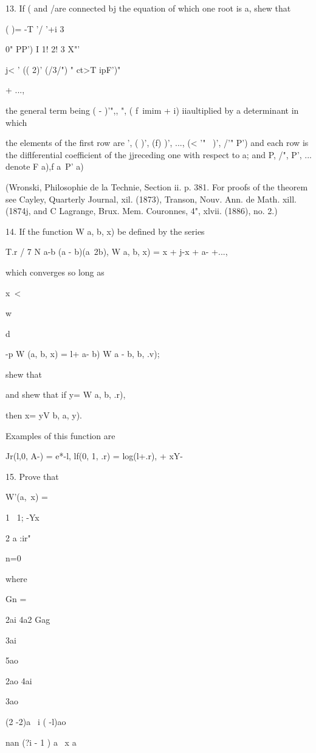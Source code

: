 {{13. If ( and /are connected bj the equation of which one root is a,
shew that

 ( )= -T '/ '+i 3

0" PP') I 1! 2! 3 X"'

j< ' (( 2)' (/3/") " ct>T ipF')"

+ ...,

the general term being ( - )'",, ", ( f\ imim + i) iiaultiplied by a
determinant in which

the elements of the first row are ', ( )', (f) )', ..., (< '"~ )', /'"
P') and each row is the diflferential coefficient of the jjreceding
one with respect to a; and P, /", P', ... denote F a),f a\ P' a)

(Wronski, Philosophie de la Technie, Section ii. p. 381. For proofs of
the theorem see Cayley, Quarterly Journal, xil. (1873), Transon, Nouv.
Ann. de Math. xill. (1874j, and C Lagrange, Brux. Mem. Couronnes, 4",
xlvii. (1886), no. 2.)

14. If the function W a, b, x) be defined by the series

T.r / 7 N a-b (a - b)(a~2b), W a, b, x) = x + j-x + a- +...,

which converges so long as

x\ <

w

d

-p W (a, b, x) = l+ a- b) W a - b, b, .v);

shew that

and shew that if y= W a, b, .r),

then x= yV b, a, y).

Examples of this function are

Jr(l,0, A-) = e*-l, lf(0, 1, .r) = log(l+.r), + xY-\

15. Prove that

W'(a, \,x) =

1 \ 1; -Yx


2 a :ir"

n=0

where

Gn =

2ai 4a2 Gag

3ai

5ao

2ao 4ai

3ao

(2 -2)a \ i ( -l)ao

nan (?i - 1 ) a \ x a

}}
